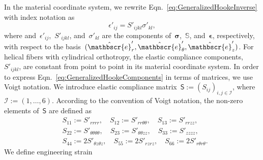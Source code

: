 \documentclass[preprint,10pt,times]{elsarticle}
\numberwithin{equation}{section}
\newcommand{\physe}{\hat{\mathbscr{e}}} %
\renewcommand{\u}[1]{\boldsymbol{#1}}
\newcommand{\usf}[1]{\u{\mathsf #1}}
\newcommand{\pr}[1]{\left( #1 \right)}
\renewcommand{\>}{$\Rightarrow$}
\begin{document}
In the material coordinate system, we rewrite Eqn.~\eqref{eq:GeneralizedHookeInverse} with index notation as
\begin{equation}
\epsilon'_{ij} = S'_{ijkl} \sigma'_{kl},
\label{eq:GeneralizedHookeComponents}
\end{equation}
where and~$\epsilon'_{ij}$,~$S'_{ijkl}$, and~$\sigma'_{kl}$ are the components of~$\u{\sigma}$,~$\mathbb{S}$, and~$\u{\epsilon}$, respectively, with respect to the basis~$(\physe'_{r},\physe'_{\theta},\physe'_{z})$. For helical fibers with cylindrical orthotropy, the elastic compliance components,~$S'_{ijkl}$, are constant from point to point in its material coordinate system.
In order to express Eqn.~\eqref{eq:GeneralizedHookeComponents} in terms of matrices, we use Voigt notation.
We introduce elastic compliance matrix~$\usf{S} := \pr{S_{ij}}_{i,j \in\mathcal{I}}$, where~$\mathcal{I} :=\pr{1,\ldots,6}$. 
According to the convention of Voigt notation, the non-zero elements of~$\usf{S}$ are defined as 
\begin{align*}
& S_{11} := S'_{rrrr},\quad S_{12} := S'_{rr\theta\theta},\quad S_{13} := S'_{rrzz}, \\
& S_{22} := S'_{\theta\theta\theta\theta},\quad S_{23} := S'_{\theta\theta zz},\quad S_{33} := S'_{zzzz}, \\
& S_{44} := 2 S'_{\theta z\theta z},\quad S_{55} := 2 S'_{rzrz},\quad S_{66} := 2 S'_{r\theta r\theta}. 
\end{align*}
We define engineering strain
\end{document}
